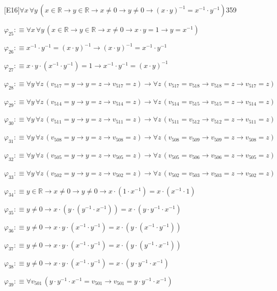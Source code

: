 \begin{fullproof}{[E16]}{$\forall x\,\forall y\,(x \in \mathbb{R} \to y \in \mathbb{R} \to x \neq 0 \to y \neq 0 \to (x \cdot y)^{-1} = x^{-1} \cdot y^{-1})$}{359}
\begin{abbrevlist}
\item $\varphi_{25} :\equiv \forall x\,\forall y\,(x \in \mathbb{R} \to y \in \mathbb{R} \to x \neq 0 \to x \cdot y = 1 \to y = x^{-1})$
\item $\varphi_{26} :\equiv x^{-1} \cdot y^{-1} = (x \cdot y)^{-1} \to (x \cdot y)^{-1} = x^{-1} \cdot y^{-1}$
\item $\varphi_{27} :\equiv x \cdot y \cdot (x^{-1} \cdot y^{-1}) = 1 \to x^{-1} \cdot y^{-1} = (x \cdot y)^{-1}$
\item $\varphi_{28} :\equiv \forall y\,\forall z\,(v_{517} = y \to y = z \to v_{517} = z) \to \forall z\,(v_{517} = v_{518} \to v_{518} = z \to v_{517} = z)$
\item $\varphi_{29} :\equiv \forall y\,\forall z\,(v_{514} = y \to y = z \to v_{514} = z) \to \forall z\,(v_{514} = v_{515} \to v_{515} = z \to v_{514} = z)$
\item $\varphi_{30} :\equiv \forall y\,\forall z\,(v_{511} = y \to y = z \to v_{511} = z) \to \forall z\,(v_{511} = v_{512} \to v_{512} = z \to v_{511} = z)$
\item $\varphi_{31} :\equiv \forall y\,\forall z\,(v_{508} = y \to y = z \to v_{508} = z) \to \forall z\,(v_{508} = v_{509} \to v_{509} = z \to v_{508} = z)$
\item $\varphi_{32} :\equiv \forall y\,\forall z\,(v_{505} = y \to y = z \to v_{505} = z) \to \forall z\,(v_{505} = v_{506} \to v_{506} = z \to v_{505} = z)$
\item $\varphi_{33} :\equiv \forall y\,\forall z\,(v_{502} = y \to y = z \to v_{502} = z) \to \forall z\,(v_{502} = v_{503} \to v_{503} = z \to v_{502} = z)$
\item $\varphi_{34} :\equiv y \in \mathbb{R} \to x \neq 0 \to y \neq 0 \to x \cdot (1 \cdot x^{-1}) = x \cdot (x^{-1} \cdot 1)$
\item $\varphi_{35} :\equiv y \neq 0 \to x \cdot (y \cdot (y^{-1} \cdot x^{-1})) = x \cdot (y \cdot y^{-1} \cdot x^{-1})$
\item $\varphi_{36} :\equiv y \neq 0 \to x \cdot y \cdot (x^{-1} \cdot y^{-1}) = x \cdot (y \cdot (x^{-1} \cdot y^{-1}))$
\item $\varphi_{37} :\equiv y \neq 0 \to x \cdot y \cdot (x^{-1} \cdot y^{-1}) = x \cdot (y \cdot (y^{-1} \cdot x^{-1}))$
\item $\varphi_{38} :\equiv y \neq 0 \to x \cdot y \cdot (x^{-1} \cdot y^{-1}) = x \cdot (y \cdot y^{-1} \cdot x^{-1})$
\item $\varphi_{39} :\equiv \forall v_{501}\,(y \cdot y^{-1} \cdot x^{-1} = v_{501} \to v_{501} = y \cdot y^{-1} \cdot x^{-1})$

\end{abbrevlist}
\end{fullproof}
